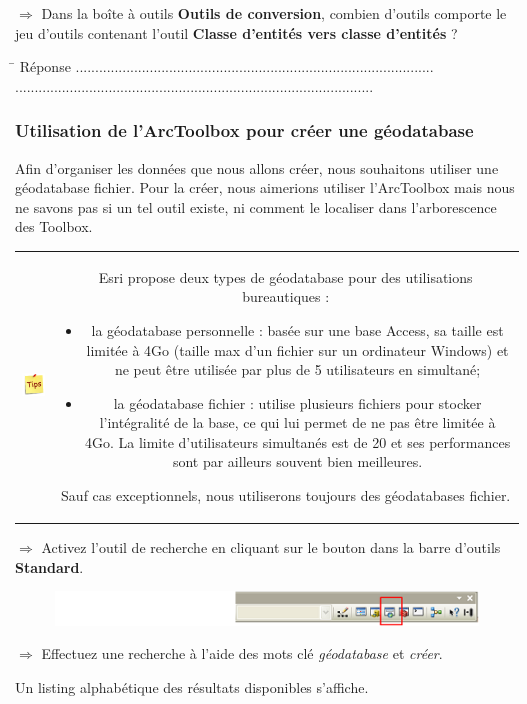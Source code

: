 \documentclass[11pt]{article}
\newcommand{\action}{$\Rightarrow$ }
\newcommand{\reponse}{
	\begin{tabbing}
	\hspace{2cm}\=\kill
	Réponse \> ............................................................................................ \\ 
 	\> ............................................................................................
	\end{tabbing}
}
\newenvironment{note}{%
	\begin{tabular}[t t]{c c}
		\includegraphics{img/tips.png}
		 &
		\begin{minipage}[c]{0.9\linewidth}
			\begin{sffamily}
}{%
			\end{sffamily}
		\end{minipage}
	\end{tabular}	
}
\begin{document}
\action Dans la boîte à outils \textbf{Outils de conversion}, combien d'outils comporte le jeu d'outils contenant l'outil \textbf{Classe d'entités vers classe d'entités} ?

\reponse


\subsubsection{Utilisation de l'ArcToolbox pour créer une géodatabase}
Afin d'organiser les données que nous allons créer, nous souhaitons utiliser une géodatabase fichier. Pour la créer, nous aimerions utiliser l'ArcToolbox mais nous ne savons pas si un tel outil existe, ni comment le localiser dans l'arborescence des Toolbox.

\begin{note}
Esri propose deux types de géodatabase pour des utilisations bureautiques :
\begin{itemize}
	\item la géodatabase personnelle : basée sur une base Access, sa taille est limitée à 4Go (taille max d'un fichier sur un ordinateur Windows) et ne peut être utilisée par plus de 5 utilisateurs en simultané;
	\item la géodatabase fichier : utilise plusieurs fichiers pour stocker l'intégralité de la base, ce qui lui permet de ne pas être limitée à 4Go. La limite d'utilisateurs simultanés est de 20 et ses performances sont par ailleurs souvent bien meilleures.
\end{itemize}
Sauf cas exceptionnels, nous utiliserons toujours des géodatabases fichier.
\end{note}

\action Activez l'outil de recherche en cliquant sur le bouton dans la barre d'outils \textbf{Standard}.
\begin{figure}[H]
	\center \includegraphics{img/td3/arctoolbox_bouton_recherche.png}\\
\end{figure}

\action Effectuez une recherche à l'aide des mots clé \textit{géodatabase} et \textit{créer}.

Un listing alphabétique des résultats disponibles s'affiche.
\end{document}
